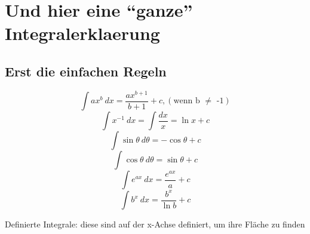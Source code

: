 \documentclass{report}
\begin{document}
\section{Und hier eine ``ganze'' Integralerklaerung}
\begin{multicols}{2}
  \subsection{Erst die einfachen Regeln}
  \[\int ax^b\ dx= \frac{ax^{b+1}}{b+1}+c, (\text{wenn b $\ne$ -1})\]
  \[\int x^{-1}\ dx = \int \frac{dx}{x} = \ln x + c\]
  \[\int \sin \theta\ d\theta = -\cos \theta + c\]
  \[\int \cos \theta\ d\theta = \sin \theta + c\]
  \[\int e^{ax}\ dx= \frac{e^{ax}}{a}+c\]
  \[\int b^x\ dx = \frac{b^x}{\ln b} + c\]




Definierte Integrale: diese sind auf der x-Achse definiert, um ihre Fl\"ache zu finden
\end{multicols}
\end{document}
